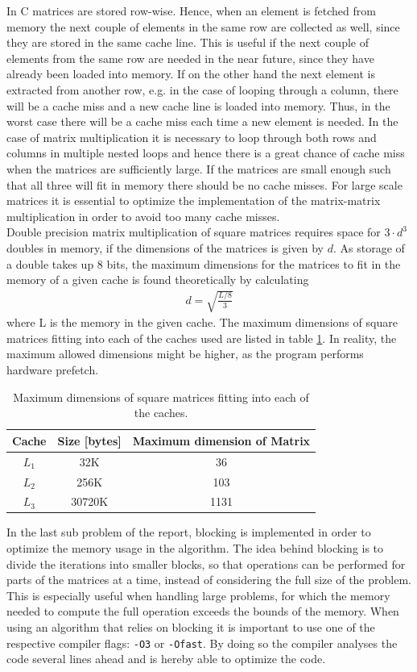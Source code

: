 In C matrices are stored row-wise. Hence, when an element is fetched from memory the next couple of elements in the same row are collected as well, since they are stored in the same cache line. This is useful if the next couple of elements from the same row are needed in the near future, since they have already been loaded into memory. If on the other hand the next element is extracted from another row, e.g. in the case of looping through a column, there will be a cache miss and a new cache line is loaded into memory. Thus, in the worst case there will be a cache miss each time a new element is needed. In the case of matrix multiplication it is necessary to loop through both rows and columns in multiple nested loops and hence there is a great chance of cache miss when the matrices are sufficiently large. If the matrices are small enough such that all three will fit in memory there should be no cache misses. For large scale matrices it is essential to optimize the implementation of the matrix-matrix multiplication in order to avoid too many cache misses.\\

Double precision matrix multiplication of square matrices requires space for $3\cdot d^3$ doubles in memory, if the dimensions of the matrices is given by $d$. As storage of a double takes up 8 bits, the maximum dimensions for the matrices to fit in the memory of a given cache is found theoretically by calculating
\begin{align*}
    d = \sqrt{\frac{L/8}{3}}
\end{align*}
where L is the memory in the given cache. The maximum dimensions of square matrices fitting into each of the caches used are listed in table \ref{tab:cache_max_dim}. In reality, the maximum allowed dimensions might be higher, as the program performs hardware prefetch. 
\begin{table}[h]
    \centering
    \begin{tabular}{c|c|c}
         Cache & Size [bytes] & Maximum dimension of Matrix  \\ \hline
         $L_1$ & 32K & 36 \\
         $L_2$ & 256K & 103 \\
         $L_3$ & 30720K & 1131 
    \end{tabular}
    \caption{Maximum dimensions of square matrices fitting into each of the caches.}
    \label{tab:cache_max_dim}
\end{table}

In the last sub problem of the report, blocking is implemented in order to optimize the memory usage in the algorithm. The idea behind blocking is to divide the iterations into smaller blocks, so that operations can be performed for parts of the matrices at a time, instead of considering the full size of the problem. This is especially useful when handling large problems, for which the memory needed to compute the full operation exceeds the bounds of the memory. When using an algorithm that relies on blocking it is important to use one of the respective compiler flags: \texttt{-O3} or \texttt{-Ofast}. By doing so the compiler analyses the code several lines ahead and is hereby able to optimize the code. 

